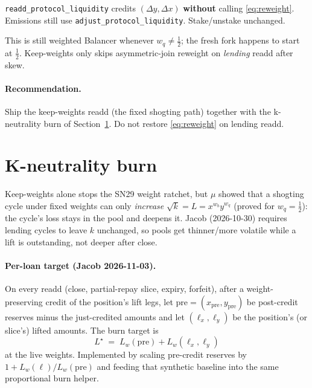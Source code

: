 \documentclass[11pt]{article}
\theoremstyle{definition}
\theoremstyle{remark}
\begin{document}
\texttt{readd\_protocol\_liquidity} credits $(\Delta y,\Delta x)$
\textbf{without} calling \eqref{eq:reweight}. Emissions still use
\texttt{adjust\_protocol\_liquidity}. Stake/unstake unchanged.

This is still weighted Balancer whenever $w_q\neq\tfrac12$; the fresh
fork happens to start at $\tfrac12$. Keep-weights only skips
asymmetric-join reweight on \emph{lending} readd after skew.

\paragraph{Recommendation.}
Ship the keep-weights readd (the fixed shogting path) together with the
k-neutrality burn of Section~\ref{sec:k-neutral}. Do not restore
\eqref{eq:reweight} on lending readd.

\section{K-neutrality burn}
\label{sec:k-neutral}

Keep-weights alone stops the SN29 weight ratchet, but $\mu$ showed that a
shogting cycle under fixed weights can only \emph{increase}
$\sqrt{k}=L=x^{w_b}y^{w_q}$ (proved for $w_q=\tfrac12$): the cycle's loss
stays in the pool and deepens it. Jacob (2026-10-30) requires lending
cycles to leave $k$ unchanged, so pools get thinner/more volatile while
a lift is outstanding, not deeper after close.

\paragraph{Per-loan target (Jacob 2026-11-03).}
On every readd (close, partial-repay slice, expiry, forfeit), after a
weight-preserving credit of the position's lift legs, let
$\mathrm{pre}=(x_{\mathrm{pre}},y_{\mathrm{pre}})$ be post-credit reserves
minus the just-credited amounts and let $(\ell_x,\ell_y)$ be the
position's (or slice's) lifted amounts. The burn target is
\[
  L^\star \;=\; L_w(\mathrm{pre})+L_w(\ell_x,\ell_y)
\]
at the live weights. Implemented by scaling pre-credit reserves by
$1+L_w(\ell)/L_w(\mathrm{pre})$ and feeding that synthetic baseline into
the same proportional burn helper.
\end{document}
